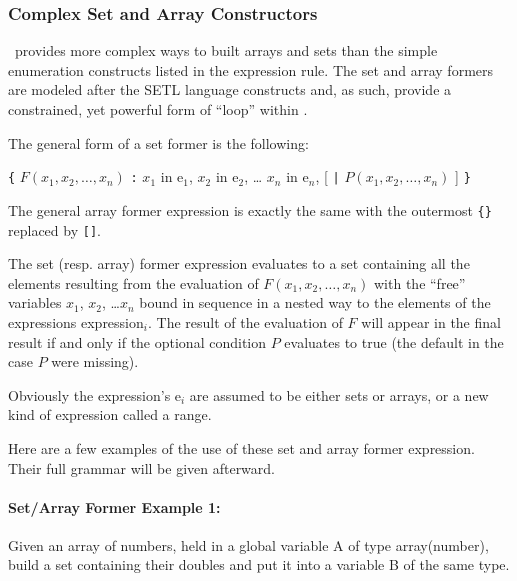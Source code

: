 \subsubsection{Complex Set and Array Constructors}

\Shift\ provides more complex ways to built arrays and sets than the
simple enumeration constructs listed in the {\nont expression} rule.
The set and array formers are modeled after the SETL language
\cite{schwartz86:_progr_sets} constructs and, as such, provide a
constrained, yet powerful form of ``loop'' within \Shift.

\noindent
The general form of a set former is the following:

\vspace{2mm}

\verb.{.
$F(x_1, x_2,\ldots, x_n)$
\verb.:.
$x_1$ {\tok in} {\nont e}$_1${\tok ,}
$x_2$ {\tok in} {\nont e}$_2${\tok ,} 
\ldots
$x_n$ {\tok in} {\nont e}$_n${\tok ,}
[ \verb.|. $P(x_1, x_2,\ldots, x_n)$ ]
\verb.}.

\vspace{2mm}

\noindent
The general array former expression is exactly the same with the
outermost \verb.{}. replaced by \verb.[]..

The set (resp. array) former expression evaluates to a set containing
all the elements resulting from the evaluation of $F(x_1, x_2, \ldots,
x_n)$ with the ``free'' variables $x_1$, $x_2$, \ldots $x_n$ bound in
sequence in a nested way to the elements of the expressions {\nont
expression}$_i$.  The result of the evaluation of $F$ will appear in
the final result if and only if the optional condition $P$ evaluates
to true (the default in the case $P$ were missing).

Obviously the {\nont expression}'s {\nont e}$_i$ are assumed to be
either sets or arrays, or a new kind of expression called a {\nont
range}.

Here are a few examples of the use of these set and array former
expression.  Their full grammar will be given afterward.

\paragraph{Set/Array Former Example 1:} Given an array of numbers,
{\tok [1, 2, 5, 12]} held in a global variable {\tok A} of type {\tok
array(number)}, build a set containing their doubles and put it into a
variable {\tok B} of the same type.

